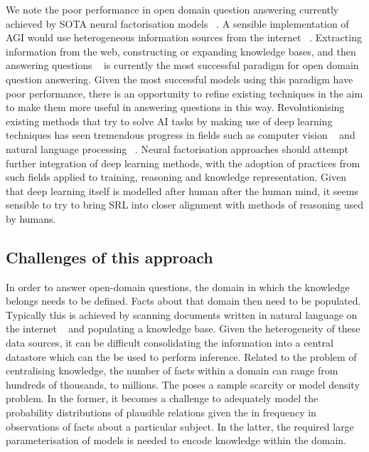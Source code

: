 We note the poor performance in open domain question answering currently achieved by SOTA neural factorisation models \unskip~\citep{balazevic2019hypernetwork, dettmers2018convolutional}. A sensible implementation of AGI would use heterogeneous information sources from the internet \unskip~\citep{angeli2013philosophers}. Extracting information from the web, constructing or expanding knowledge bases, and then answering questions \unskip~\citep{shalaby2019beyond} is currently the most successful paradigm for open domain question answering. Given the most successful models using this paradigm have poor performance, there is an opportunity to refine existing techniques in the aim to make them more useful in answering questions in this way. Revolutionising existing methods that try to solve AI tasks by making use of deep learning techniques has seen tremendous progress in fields such as computer vision \unskip~\citep{hudson2018compositional}  and natural language processing \unskip~\citep{peters2018deep}. Neural factorisation approaches should attempt further integration of deep learning methods, with the adoption of practices from such fields applied to training, reasoning and knowledge representation. Given that deep learning itself is modelled after human after the human mind, it seems sensible to try to bring SRL into closer alignment with methods of reasoning used by humans. 

\subsection{Challenges of this approach} 

In order to answer open-domain questions, the domain in which the knowledge belongs needs to be defined. Facts about that domain then need to be populated. Typically this is achieved by scanning documents written in natural language on the internet \unskip~\citep{fader2011identifying, dong2014knowledge} and populating a knowledge base. Given the heterogeneity of these data sources, it can be difficult consolidating the information into a central datastore which can the be used to perform inference.  Related to the problem of centralising knowledge, the number of facts within a domain can range from hundreds of thousands, to millions. The poses a sample scarcity or model density problem. In the former, it becomes a challenge to adequately model the probability distributions of plausible relations given the in frequency in observations of facts about a particular subject. In the latter, the required large parameterisation of  models is needed to encode knowledge within the domain. \par

